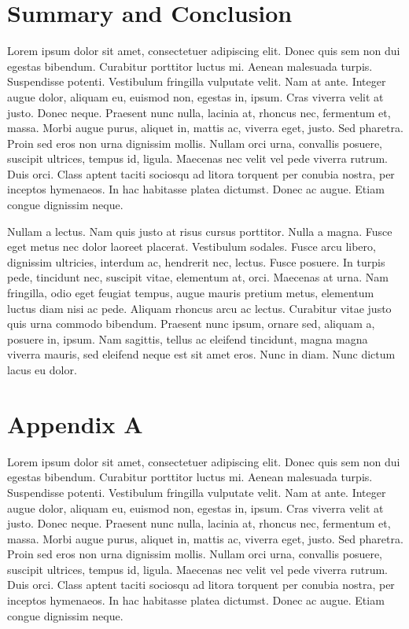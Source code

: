 \documentclass[12pt]{report}
\begin{document}
\chapter{Summary and Conclusion}

Lorem ipsum dolor sit amet, consectetuer adipiscing elit. Donec quis sem non dui egestas bibendum. Curabitur porttitor luctus mi. Aenean malesuada turpis. Suspendisse potenti. Vestibulum fringilla vulputate velit. Nam at ante. Integer augue dolor, aliquam eu, euismod non, egestas in, ipsum. Cras viverra velit at justo. Donec neque. Praesent nunc nulla, lacinia at, rhoncus nec, fermentum et, massa. Morbi augue purus, aliquet in, mattis ac, viverra eget, justo. Sed pharetra. Proin sed eros non urna dignissim mollis. Nullam orci urna, convallis posuere, suscipit ultrices, tempus id, ligula. Maecenas nec velit vel pede viverra rutrum. Duis orci. Class aptent taciti sociosqu ad litora torquent per conubia nostra, per inceptos hymenaeos. In hac habitasse platea dictumst. Donec ac augue. Etiam congue dignissim neque.

Nullam a lectus. Nam quis justo at risus cursus porttitor. Nulla a magna. Fusce eget metus nec dolor laoreet placerat. Vestibulum sodales. Fusce arcu libero, dignissim ultricies, interdum ac, hendrerit nec, lectus. Fusce posuere. In turpis pede, tincidunt nec, suscipit vitae, elementum at, orci. Maecenas at urna. Nam fringilla, odio eget feugiat tempus, augue mauris pretium metus, elementum luctus diam nisi ac pede. Aliquam rhoncus arcu ac lectus. Curabitur vitae justo quis urna commodo bibendum. Praesent nunc ipsum, ornare sed, aliquam a, posuere in, ipsum. Nam sagittis, tellus ac eleifend tincidunt, magna magna viverra mauris, sed eleifend neque est sit amet eros. Nunc in diam. Nunc dictum lacus eu dolor.


\chapter{Appendix A}

Lorem ipsum dolor sit amet, consectetuer adipiscing elit. Donec quis sem non dui egestas bibendum. Curabitur porttitor luctus mi. Aenean malesuada turpis. Suspendisse potenti. Vestibulum fringilla vulputate velit. Nam at ante. Integer augue dolor, aliquam eu, euismod non, egestas in, ipsum. Cras viverra velit at justo. Donec neque. Praesent nunc nulla, lacinia at, rhoncus nec, fermentum et, massa. Morbi augue purus, aliquet in, mattis ac, viverra eget, justo. Sed pharetra. Proin sed eros non urna dignissim mollis. Nullam orci urna, convallis posuere, suscipit ultrices, tempus id, ligula. Maecenas nec velit vel pede viverra rutrum. Duis orci. Class aptent taciti sociosqu ad litora torquent per conubia nostra, per inceptos hymenaeos. In hac habitasse platea dictumst. Donec ac augue. Etiam congue dignissim neque.
\end{document}
